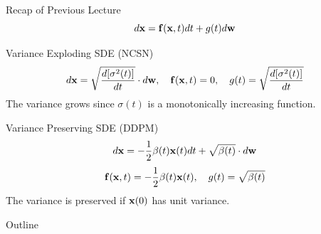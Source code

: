 \documentclass{beamer}
\begin{document}
\begin{frame}{Recap of Previous Lecture}
	\[
		d\mathbf{x} = \mathbf{f}(\mathbf{x}, t) dt + g(t) d \mathbf{w}
	\]
	\vspace{-0.5cm}
	\begin{block}{Variance Exploding SDE (NCSN)}
		\vspace{-0.5cm}
		\[
			d \mathbf{x} = \sqrt{\frac{ d [\sigma^2(t)]}{dt}} \cdot d \mathbf{w}, \quad \mathbf{f}(\mathbf{x}, t) = 0, \quad g(t) = \sqrt{\frac{ d [\sigma^2(t)]}{dt}} 
		\]
		The variance grows since $\sigma(t)$ is a monotonically increasing function.
	\end{block}
	\begin{block}{Variance Preserving SDE (DDPM)}
		\vspace{-0.3cm}
		\[
			d \mathbf{x} = - \frac{1}{2} \beta(t) \mathbf{x}(t) dt + \sqrt{\beta(t)} \cdot d \mathbf{w}
		\]
		\[
			\mathbf{f}(\mathbf{x}, t) = - \frac{1}{2} \beta(t) \mathbf{x}(t) , \quad g(t) = \sqrt{\beta(t)} 
		\]
		The variance is preserved if $\mathbf{x}(0)$ has unit variance.
	\end{block}
\end{frame}
\begin{frame}{Outline}
	\tableofcontents
\end{frame}
\end{document}
